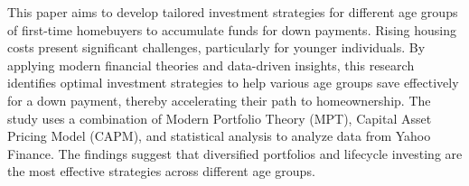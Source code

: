 This paper aims to develop tailored investment strategies for different age groups of first-time homebuyers to accumulate funds for down payments. Rising housing costs present significant challenges, particularly for younger individuals. By applying modern financial theories and data-driven insights, this research identifies optimal investment strategies to help various age groups save effectively for a down payment, thereby accelerating their path to homeownership. The study uses a combination of Modern Portfolio Theory (MPT), Capital Asset Pricing Model (CAPM), and statistical analysis to analyze data from Yahoo Finance. The findings suggest that diversified portfolios and lifecycle investing are the most effective strategies across different age groups.
